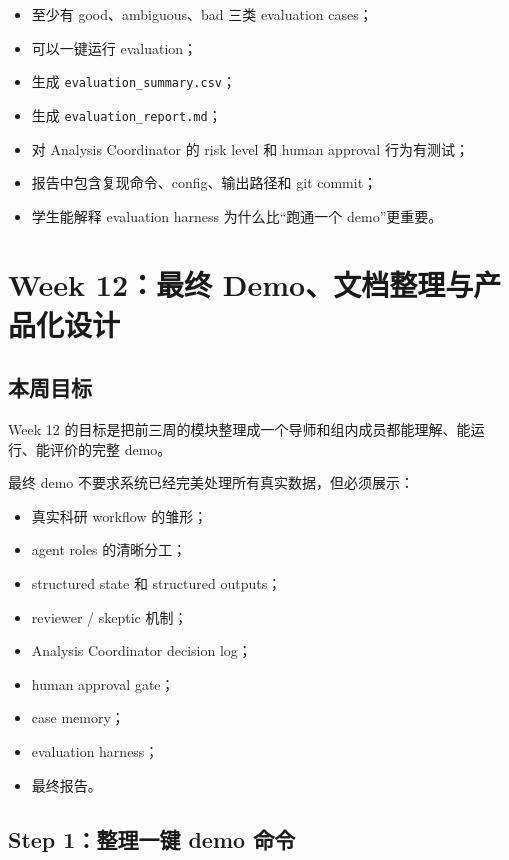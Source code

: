 \documentclass[11pt,a4paper,fontset=none]{ctexart}
\begin{document}
\begin{itemize}[leftmargin=2em]
  \item 至少有 good、ambiguous、bad 三类 evaluation cases；
  \item 可以一键运行 evaluation；
  \item 生成 \texttt{evaluation\_summary.csv}；
  \item 生成 \texttt{evaluation\_report.md}；
  \item 对 Analysis Coordinator 的 risk level 和 human approval 行为有测试；
  \item 报告中包含复现命令、config、输出路径和 git commit；
  \item 学生能解释 evaluation harness 为什么比“跑通一个 demo”更重要。
\end{itemize}

\newpage

\section{Week 12：最终 Demo、文档整理与产品化设计}

\subsection{本周目标}

Week 12 的目标是把前三周的模块整理成一个导师和组内成员都能理解、能运行、能评价的完整 demo。

最终 demo 不要求系统已经完美处理所有真实数据，但必须展示：

\begin{itemize}[leftmargin=2em]
  \item 真实科研 workflow 的雏形；
  \item agent roles 的清晰分工；
  \item structured state 和 structured outputs；
  \item reviewer / skeptic 机制；
  \item Analysis Coordinator decision log；
  \item human approval gate；
  \item case memory；
  \item evaluation harness；
  \item 最终报告。
\end{itemize}

\subsection{Step 1：整理一键 demo 命令}
\end{document}
